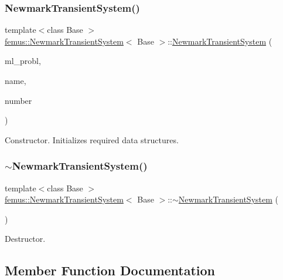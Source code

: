 \subsubsection{\texorpdfstring{Newmark\+Transient\+System()}{NewmarkTransientSystem()}}
{\footnotesize\ttfamily template$<$class Base $>$ \\
\mbox{\hyperlink{classfemus_1_1_newmark_transient_system}{femus\+::\+Newmark\+Transient\+System}}$<$ Base $>$\+::\mbox{\hyperlink{classfemus_1_1_newmark_transient_system}{Newmark\+Transient\+System}} (\begin{DoxyParamCaption}\item[{\mbox{\hyperlink{classfemus_1_1_multi_level_problem}{Multi\+Level\+Problem}} \&}]{ml\+\_\+probl,  }\item[{const std\+::string \&}]{name,  }\item[{const unsigned int}]{number }\end{DoxyParamCaption})}

Constructor. Initializes required data structures. \mbox{\label{classfemus_1_1_newmark_transient_system_aeed35f6e2cfb43ef24a79a39ab7a789c}} 
\subsubsection{\texorpdfstring{$\sim$\+Newmark\+Transient\+System()}{~NewmarkTransientSystem()}}
{\footnotesize\ttfamily template$<$class Base $>$ \\
\mbox{\hyperlink{classfemus_1_1_newmark_transient_system}{femus\+::\+Newmark\+Transient\+System}}$<$ Base $>$\+::$\sim$\mbox{\hyperlink{classfemus_1_1_newmark_transient_system}{Newmark\+Transient\+System}} (\begin{DoxyParamCaption}{ }\end{DoxyParamCaption})\hspace{0.3cm}{\ttfamily [virtual]}}

Destructor. 

\subsection{Member Function Documentation}
\mbox{\label{classfemus_1_1_newmark_transient_system_a5fc2d316ab3e7e7b42222b1e2c1bff34}} 

